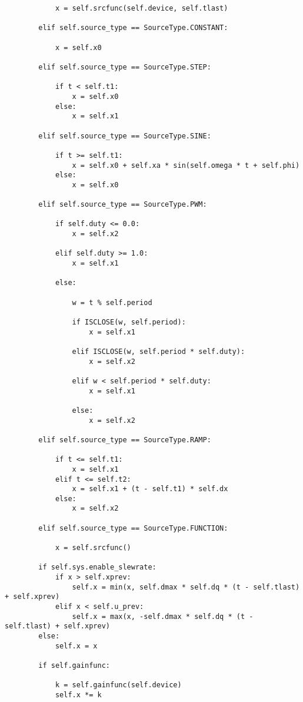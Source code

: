 \begin{lstlisting}
            x = self.srcfunc(self.device, self.tlast)

        elif self.source_type == SourceType.CONSTANT:

            x = self.x0

        elif self.source_type == SourceType.STEP:

            if t < self.t1:
                x = self.x0
            else:
                x = self.x1

        elif self.source_type == SourceType.SINE:

            if t >= self.t1:
                x = self.x0 + self.xa * sin(self.omega * t + self.phi)
            else:
                x = self.x0

        elif self.source_type == SourceType.PWM:

            if self.duty <= 0.0:
                x = self.x2

            elif self.duty >= 1.0:
                x = self.x1

            else:

                w = t % self.period

                if ISCLOSE(w, self.period):
                    x = self.x1

                elif ISCLOSE(w, self.period * self.duty):
                    x = self.x2

                elif w < self.period * self.duty:
                    x = self.x1

                else:
                    x = self.x2

        elif self.source_type == SourceType.RAMP:

            if t <= self.t1:
                x = self.x1
            elif t <= self.t2:
                x = self.x1 + (t - self.t1) * self.dx
            else:
                x = self.x2

        elif self.source_type == SourceType.FUNCTION:

            x = self.srcfunc()

        if self.sys.enable_slewrate:
            if x > self.xprev:
                self.x = min(x, self.dmax * self.dq * (t - self.tlast) + self.xprev)
            elif x < self.u_prev:
                self.x = max(x, -self.dmax * self.dq * (t - self.tlast) + self.xprev)
        else:
            self.x = x

        if self.gainfunc:

            k = self.gainfunc(self.device)
            self.x *= k


\end{lstlisting}
